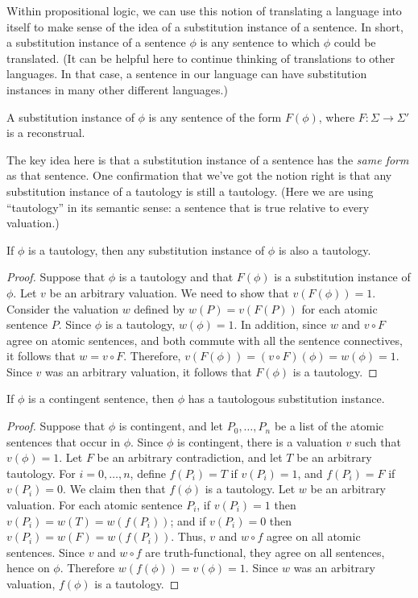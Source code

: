 Within propositional logic, we can use this notion of translating a
language into itself to make sense of the idea of a substitution
instance of a sentence.  In short, a substitution instance of a
sentence $\phi$ is any sentence to which $\phi$ could be translated.
(It can be helpful here to continue thinking of translations to other
languages.  In that case, a sentence in our language can have
substitution instances in many other different languages.)
\begin{defn} A \gls{substitution instance} of $\phi$ is any sentence
  of the form $F(\phi )$, where $F:\Sigma\to\Sigma '$ is a
  reconstrual. \end{defn} The key idea here is that a substitution
instance of a sentence has the {\it same form} as that sentence.  One
confirmation that we've got the notion right is that any substitution
instance of a tautology is still a tautology.  (Here we are using
``tautology'' in its semantic sense: a sentence that is true relative
to every valuation.)

\begin{prop} If $\phi$ is a tautology, then any substitution instance
  of $\phi$ is also a tautology. \end{prop}

\begin{proof} Suppose that $\phi$ is a tautology and that $F(\phi )$
  is a substitution instance of $\phi$.  Let $v$ be an arbitrary
  valuation.  We need to show that $v(F(\phi ))=1$.  Consider the
  valuation $w$ defined by $w(P)=v(F(P))$ for each atomic sentence
  $P$.  Since $\phi$ is a tautology, $w(\phi )=1$.  In addition, since
  $w$ and $v\circ F$ agree on atomic sentences, and both commute with
  all the sentence connectives, it follows that $w=v\circ F$.
  Therefore, $v(F(\phi ))=(v\circ F)(\phi )=w(\phi )=1$.  Since $v$
  was an arbitrary valuation, it follows that $F(\phi )$ is a
  tautology. \end{proof}

\begin{prop} If $\phi$ is a contingent sentence, then $\phi$ has a
  tautologous substitution instance. \end{prop}

\begin{proof} Suppose that $\phi$ is contingent, and let
  $P_0,\dots ,P_n$ be a list of the atomic sentences that occur in
  $\phi$.  Since $\phi$ is contingent, there is a valuation $v$ such
  that $v(\phi )=1$.  Let $F$ be an arbitrary contradiction, and let
  $T$ be an arbitrary tautology.  For $i=0,\dots ,n$, define
  $f(P_i)=T$ if $v(P_i)=1$, and $f(P_i)=F$ if $v(P_i)=0$.  We claim
  then that $f(\phi )$ is a tautology.  Let $w$ be an arbitrary
  valuation.  For each atomic sentence $P_i$, if $v(P_i)=1$ then
  $v(P_i)=w(T)=w(f(P_i))$; and if $v(P_i)=0$ then
  $v(P_i)=w(F)=w(f(P_i))$.  Thus, $v$ and $w\circ f$ agree on all
  atomic sentences.  Since $v$ and $w\circ f$ are truth-functional,
  they agree on all sentences, hence on $\phi$.  Therefore
  $w(f(\phi ))=v(\phi )=1$.  Since $w$ was an arbitrary valuation,
  $f(\phi )$ is a tautology. \end{proof}

